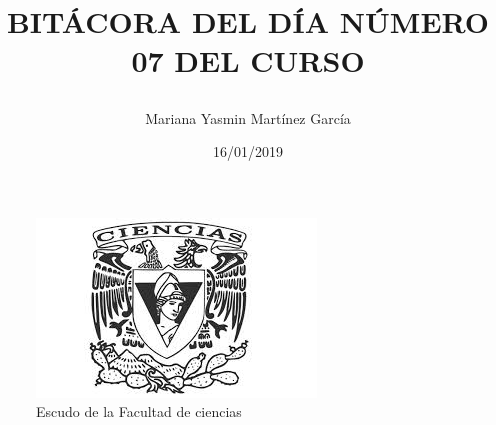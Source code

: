 \documentclass{article}
\title{\Huge\item\color{blue}\textbf{BITÁCORA DEL DÍA NÚMERO 07 DEL CURSO}}
\author{\Large Mariana Yasmin Martínez García}
\date{\Large 16/01/2019}
\begin{document}
\begin{figure}[t]
	\centering
	\includegraphics[width=0.4\linewidth]{Imagenes/1}
	\caption{Escudo de la Facultad de ciencias}
	\label{fig:1}
\end{figure}
	\maketitle
		
	\newpage
	
\end{document}
